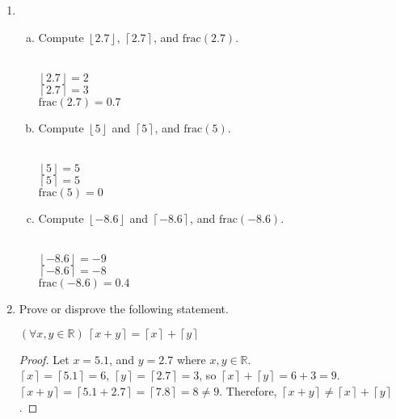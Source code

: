 \documentclass[12pt]{amsart}
\newcommand{\floor}[1]{\ensuremath{\left\lfloor #1\right\rfloor}}
\newcommand{\ceil}[1]{\ensuremath{\left\lceil #1\right\rceil}}
\begin{document}
\vspace{0.2in}
\begin{enumerate}[{\bfseries 1.}]
\addtocounter{enumi}{2}
\item\begin{enumerate}[(a)]
	\vspace{0.1in}
	\item Compute $\floor{2.7}$, $\ceil{2.7}$, and $\text{frac}(2.7)$.
	\begin{normalize}
	\vspace{0.1in}
	\\$\floor{2.7} = 2$
	\\$\ceil{2.7} = 3$
	\\$\text{frac}(2.7) = 0.7$
	\\
	\end{normalize}
	\item Compute $\floor{5}$ and $\ceil{5}$, and $\text{frac}(5)$.
	\begin{normalize}
	\vspace{0.1in}
	\\$\floor{5} = 5$
	\\$\ceil{5} = 5$
	\\$\text{frac}(5) = 0$
	\\
	\end{normalize}
	\item Compute $\floor{-8.6}$ and $\ceil{-8.6}$, and $\text{frac}(-8.6)$.
	\begin{normalize}
	\vspace{0.1in}
	\\$\floor{-8.6} = -9$
	\\$\ceil{-8.6} = -8$
	\\$\text{frac}(-8.6) = 0.4$
	\\
	\end{normalize}
	\end{enumerate}

\vspace{0.2in}
\item Prove or disprove the following statement.

	\vspace{0.1in}
	\begin{center}
	\noindent
	\textit{$(\forall x, y\in\mathbb{R})\ \ceil{x+y}=\ceil{x}+\ceil{y}$}
	\end{center}
	\begin{normalize}
	\vspace{0.1in}
    	\begin{proof}
    	Let $x = 5.1$, and $y = 2.7$ where $x, y\in\mathbb{R}$. 
    	\\$\ceil{x} = \ceil{5.1} = 6$, $\ceil{y} = \ceil{2.7} = 3$, so $\ceil{x} + \ceil{y} = 6 + 3 = 9$.
    	\\$\ceil{x+y} = \ceil{5.1 + 2.7} = \ceil{7.8} = 8\neq 9$.
    	Therefore, $\ceil{x+y} \neq\ceil{x} + \ceil{y}$.
    	\end{proof}
	\end{normalize}
	\vfill
	\vfill


\end{enumerate}
\end{document}
